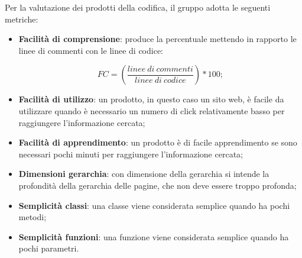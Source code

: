 Per la valutazione dei prodotti della codifica, il gruppo adotta le seguenti metriche:
\begin{itemize}
	\item \textbf{Facilità di comprensione}: produce la percentuale mettendo in rapporto le linee di commenti con le linee di codice:
\begin{center}
\[FC = \left(\frac{linee\ di\ commenti}{linee\ di\ codice}\right)*100;\]
\end{center}
	\item \textbf{Facilità di utilizzo}: un prodotto, in questo caso un sito web, è facile da utilizzare quando è necessario un numero di click relativamente basso per raggiungere l'informazione cercata;
	\item \textbf{Facilità di apprendimento}: un prodotto è di facile apprendimento se sono necessari pochi minuti per raggiungere l'informazione cercata;
	\item \textbf{Dimensioni gerarchia}: con dimensione della gerarchia si intende la profondità della gerarchia delle pagine, che non deve essere troppo profonda;
	\item \textbf{Semplicità classi}: una classe viene considerata semplice quando ha pochi metodi;
	\item \textbf{Semplicità funzioni}: una funzione viene considerata semplice quando ha pochi parametri.
\end{itemize}



